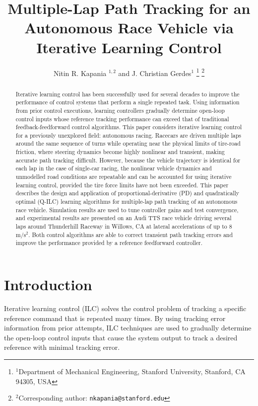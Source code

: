 \documentclass[letterpaper, 10 pt, conference]{ieeeconf}  %
\title{\LARGE \bf
Multiple-Lap Path Tracking for an Autonomous Race Vehicle via Iterative Learning Control }
\author{Nitin R. Kapania $^{1,2}$ and J. Christian Gerdes$^{1}$%
\thanks{$^{1}$Department of Mechanical Engineering, Stanford University, Stanford, CA 94305, USA}
\thanks{$^{2}$Corresponding author: {\tt\small nkapania@stanford.edu}}
}
\begin{document}
\maketitle
\thispagestyle{empty}
\pagestyle{empty}


\begin{abstract}

Iterative learning control has been successfully used for several decades to improve the performance of control 
systems that perform a single repeated task. Using information from prior control executions, learning controllers gradually 
determine open-loop control inputs whose reference tracking performance can exceed that of traditional feedback-feedforward control algorithms. This paper considers
iterative learning control for a previously unexplored field: autonomous racing. Racecars are driven multiple laps around
the same sequence of turns while operating near the physical limits of tire-road friction, where steering dynamics become highly nonlinear and transient, making
accurate path tracking difficult. However, because the vehicle trajectory is identical for each lap in the case of single-car racing, the nonlinear vehicle dynamics
 and unmodelled road conditions are repeatable and can be accounted for using iterative learning control, provided the tire force limits have not been exceeded.
 This paper describes the design and application of proportional-derivative (PD) and quadratically
optimal (Q-ILC) learning algorithms for multiple-lap path tracking of an autonomous race vehicle. Simulation results are used to tune controller gains and test convergence, and 
experimental results are presented on an Audi TTS race vehicle driving several laps around Thunderhill Raceway in Willows, CA at lateral accelerations of up to 8 $\mathrm{m/s^2}$. Both
control algorithms are able to correct transient path tracking errors and improve the performance provided by a reference feedforward controller.
 

\end{abstract}


\section{Introduction}

Iterative learning control (ILC) solves the control problem of tracking a specific reference command that is repeated many times. 
By using tracking error information from prior attempts, ILC techniques are used to gradually determine the open-loop
control inputs that cause the system output to track a desired reference with minimal tracking error. 
\end{document}
